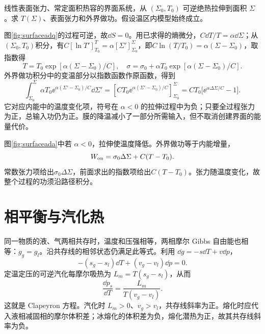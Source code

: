 \begin{example}[界面的绝热温度变化]
线性表面张力、常定面积热容的界面系统，从 $(\Sigma_0,T_0)$ 可逆绝热拉伸到面积 $\Sigma$。求 $T(\Sigma)$、表面张力和外界做功。假设温区内模型始终成立。
\end{example}
\begin{solution}
图\ref{fig:surfaceadq}的过程可逆，故$\dd S=0$。用已求得的熵微分，$C\dd T/T=\alpha\dd\Sigma$；从$(\Sigma_0,T_0)$积分，有$C[\ln T']_{T_0}^{T}=\alpha[\Sigma']_{\Sigma_0}^{\Sigma}$，即$C\ln(T/T_0)=\alpha(\Sigma-\Sigma_0)$，取指数得
\[
 T=T_0\exp[\alpha(\Sigma-\Sigma_0)/C],\quad
 \sigma=\sigma_0+\alpha T_0\exp[\alpha(\Sigma-\Sigma_0)/C].
\]
外界做功积分中的变温部分以指数函数作原函数，得到
\[
 \int_{\Sigma_0}^{\Sigma}\alpha T_0
 \ee^{\alpha(\Sigma'-\Sigma_0)/C}\dd\Sigma'
 =\left[CT_0\ee^{\alpha(\Sigma'-\Sigma_0)/C}\right]_{\Sigma_0}^{\Sigma}
 =CT_0\bigl[\ee^{\alpha\Delta\Sigma/C}-1\bigr].
\]
它对应内能中的温度变化项，符号在 $\alpha<0$ 的拉伸过程中为负；只要全过程张力为正，总输入功仍为正。膜的降温减小了一部分所需输入，但不取消创建界面的能量代价。

图\ref{fig:surfaceada}中若 $\alpha<0$，拉伸使温度降低。外界做功等于内能增量，
\[
 W_{\rm on}=\sigma_0\Delta\Sigma+C(T-T_0).
\]
常数张力项给出$\sigma_0\Delta\Sigma$，前面求出的指数项给出$C(T-T_0)$。张力随温度变化，故整个过程的功须沿路径积分。
\end{solution}

\section{相平衡与汽化热}
\label{th:clapeyron}
同一物质的液、气两相共存时，温度和压强相等，两相摩尔 Gibbs 自由能也相等：$g_g=g_l$。沿共存线的相邻状态仍满足此等式。利用 $\dd g=-s\dd T+v\dd p$，
\[
 -(s_g-s_l)\dd T+(v_g-v_l)\dd p=0.
\]
定温定压的可逆汽化每摩尔吸热为 $L_m=T(s_g-s_l)$，从而
\begin{equation}\label{eq:clapeyron}
 \frac{\dd p_s}{\dd T}=\frac{L_m}{T(v_g-v_l)}.
\end{equation}
这就是 Clapeyron 方程。汽化时 $L_m>0$、$v_g>v_l$，共存线斜率为正。熔化时应代入液相减固相的摩尔体积差；冰熔化的体积差为负，熔化潜热为正，故其共存线斜率为负。

